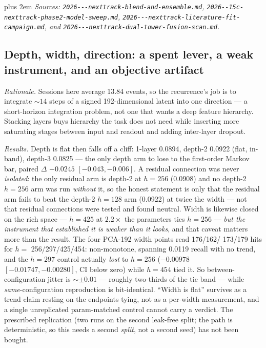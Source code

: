\documentclass[11pt]{article}
\begin{document}
{\rightskip=0pt plus 2em \emph{Sources: \texttt{2026---\allowbreak nexttrack-\allowbreak blend-\allowbreak and-\allowbreak ensemble.md},
\texttt{2026--\allowbreak 15c-\allowbreak nexttrack-\allowbreak phase2-\allowbreak model-\allowbreak sweep.md},
\texttt{2026---\allowbreak nexttrack-\allowbreak literature-\allowbreak fit-\allowbreak campaign.md},
and \texttt{2026---\allowbreak nexttrack-\allowbreak dual-\allowbreak tower-\allowbreak fusion-\allowbreak scan.md}.}\par}

\subsection{Depth, width, direction: a spent lever, a weak instrument, and an objective artifact}
\label{sec:fail-topology}

\emph{Rationale.} Sessions here average \num{13.84} events, so the recurrence's
job is to integrate ${\sim}14$ steps of a signed \num{192}-dimensional latent
into one direction --- a short-horizon integration problem, not one that wants a
deep feature hierarchy. Stacking layers buys hierarchy the task does not need
while inserting more saturating stages between input and readout and adding
inter-layer dropout.

\emph{Results.} Depth is flat then falls off a cliff: 1-layer \num{0.0894},
depth-2 \num{0.0922} (flat, in-band), depth-3 \num{0.0825} --- the only depth arm
to lose to the first-order Markov bar, paired $\Delta$ $-\num{0.0245}$
$[-\num{0.043},-\num{0.006}]$. A residual connection was never \emph{isolated}:
the only residual arm is depth-2 at $h=256$ (\num{0.0908}) and no depth-2 $h=256$
arm was run \emph{without} it, so the honest statement is only that the residual
arm fails to beat the depth-2 $h=128$ arm (\num{0.0922}) at twice the width ---
not that residual connections were tested and found neutral. Width is likewise closed on the rich space
--- $h=425$ at $2.2\times$ the parameters ties $h=256$ --- \emph{but the
instrument that established it is weaker than it looks}, and that caveat matters
more than the result. The four PCA-192 width points read \num{176}/\num{162}/
\num{173}/\num{179} hits for $h=$ \num{256}/\num{297}/\num{425}/\num{454}:
non-monotone, spanning \num{0.0119} recall with no trend, and the $h=297$
control actually \emph{lost} to $h=256$ ($-\num{0.00978}$
$[-\num{0.01747},-\num{0.00280}]$, CI below zero) while $h=454$ tied it. So
between-configuration jitter is ${\sim}\pm\num{0.01}$ --- roughly two-thirds of
the tie band --- while \emph{same}-configuration reproduction is bit-identical.
``Width is flat'' survives as a trend claim resting on the endpoints tying, not
as a per-width measurement, and a single unreplicated param-matched control
cannot carry a verdict. The prescribed replication (two runs on the second
leak-free split; the path is deterministic, so this needs a second \emph{split},
not a second seed) has not been bought.
\end{document}
